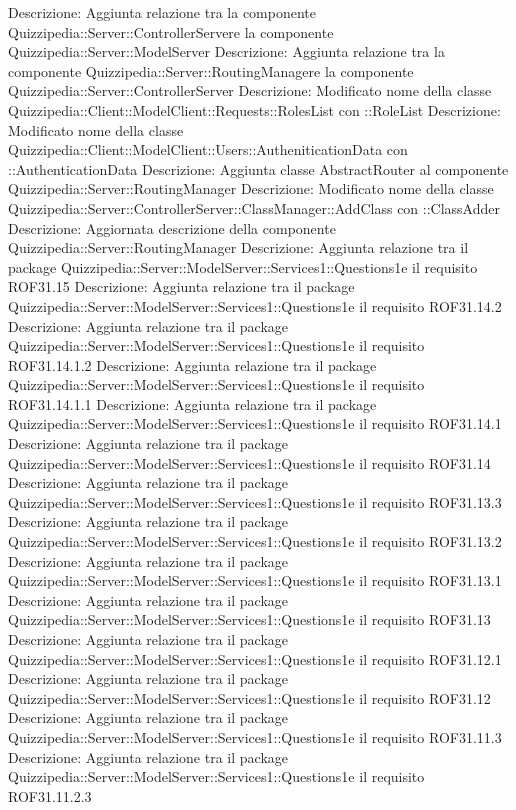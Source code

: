 Descrizione: Aggiunta relazione tra la componente Quizzipedia::Server::ControllerServere la componente Quizzipedia::Server::ModelServer 
Descrizione: Aggiunta relazione tra la componente Quizzipedia::Server::RoutingManagere la componente Quizzipedia::Server::ControllerServer 
Descrizione: Modificato nome della classe Quizzipedia::Client::ModelClient::Requests::RolesList con ::RoleList 
Descrizione: Modificato nome della classe Quizzipedia::Client::ModelClient::Users::AutheniticationData con ::AuthenticationData 
Descrizione: Aggiunta classe AbstractRouter al componente Quizzipedia::Server::RoutingManager 
Descrizione: Modificato nome della classe Quizzipedia::Server::ControllerServer::ClassManager::AddClass con ::ClassAdder 
Descrizione: Aggiornata descrizione della componente Quizzipedia::Server::RoutingManager 
Descrizione: Aggiunta relazione tra il package Quizzipedia::Server::ModelServer::Services1::Questions1e il requisito ROF31.15 
Descrizione: Aggiunta relazione tra il package Quizzipedia::Server::ModelServer::Services1::Questions1e il requisito ROF31.14.2 
Descrizione: Aggiunta relazione tra il package Quizzipedia::Server::ModelServer::Services1::Questions1e il requisito ROF31.14.1.2 
Descrizione: Aggiunta relazione tra il package Quizzipedia::Server::ModelServer::Services1::Questions1e il requisito ROF31.14.1.1 
Descrizione: Aggiunta relazione tra il package Quizzipedia::Server::ModelServer::Services1::Questions1e il requisito ROF31.14.1 
Descrizione: Aggiunta relazione tra il package Quizzipedia::Server::ModelServer::Services1::Questions1e il requisito ROF31.14 
Descrizione: Aggiunta relazione tra il package Quizzipedia::Server::ModelServer::Services1::Questions1e il requisito ROF31.13.3 
Descrizione: Aggiunta relazione tra il package Quizzipedia::Server::ModelServer::Services1::Questions1e il requisito ROF31.13.2 
Descrizione: Aggiunta relazione tra il package Quizzipedia::Server::ModelServer::Services1::Questions1e il requisito ROF31.13.1 
Descrizione: Aggiunta relazione tra il package Quizzipedia::Server::ModelServer::Services1::Questions1e il requisito ROF31.13 
Descrizione: Aggiunta relazione tra il package Quizzipedia::Server::ModelServer::Services1::Questions1e il requisito ROF31.12.1 
Descrizione: Aggiunta relazione tra il package Quizzipedia::Server::ModelServer::Services1::Questions1e il requisito ROF31.12 
Descrizione: Aggiunta relazione tra il package Quizzipedia::Server::ModelServer::Services1::Questions1e il requisito ROF31.11.3 
Descrizione: Aggiunta relazione tra il package Quizzipedia::Server::ModelServer::Services1::Questions1e il requisito ROF31.11.2.3 
